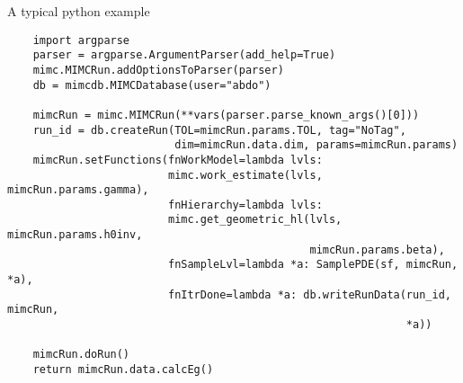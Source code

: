 \begin{frame}[fragile]{A typical python example}
\begin{verbatim}
    import argparse
    parser = argparse.ArgumentParser(add_help=True)
    mimc.MIMCRun.addOptionsToParser(parser)
    db = mimcdb.MIMCDatabase(user="abdo")

    mimcRun = mimc.MIMCRun(**vars(parser.parse_known_args()[0]))
    run_id = db.createRun(TOL=mimcRun.params.TOL, tag="NoTag",
                          dim=mimcRun.data.dim, params=mimcRun.params)
    mimcRun.setFunctions(fnWorkModel=lambda lvls:
                         mimc.work_estimate(lvls, mimcRun.params.gamma),
                         fnHierarchy=lambda lvls:
                         mimc.get_geometric_hl(lvls, mimcRun.params.h0inv,
                                               mimcRun.params.beta),
                         fnSampleLvl=lambda *a: SamplePDE(sf, mimcRun, *a),
                         fnItrDone=lambda *a: db.writeRunData(run_id, mimcRun,
                                                              *a))

    mimcRun.doRun()
    return mimcRun.data.calcEg()
\end{verbatim}
\end{frame}

